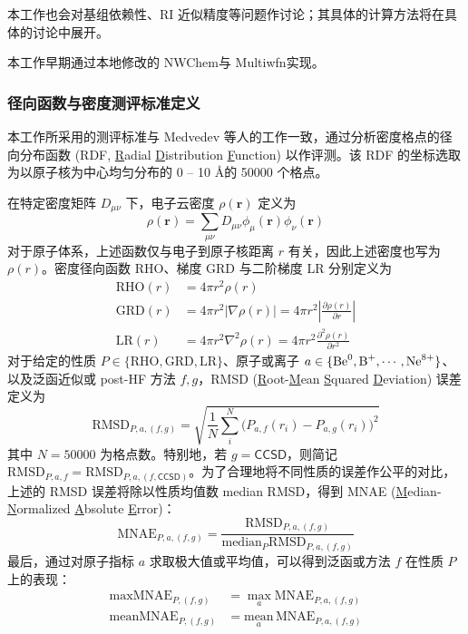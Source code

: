 本工作也会对基组依赖性、RI 近似精度等问题作讨论；其具体的计算方法将在具体的讨论中展开。

本工作早期通过本地修改的 NWChem\cite{Valiev-Jong.CPC.2010}与 Multiwfn\cite{Lu-Chen.JCC.2012}实现。

\subsubsection{径向函数与密度测评标准定义}

本工作所采用的测评标准与 Medvedev 等人的工作\cite{Medvedev-Lyssenko.S.2017}一致，通过分析密度格点的径向分布函数 (RDF, \underline{R}adial \underline{D}istribution \underline{F}unction) 以作评测。该 RDF 的坐标选取为以原子核为中心均匀分布的 0 -- 10 \AA 的 50000 个格点。

在特定密度矩阵 $D_{\mu \nu}$ 下，电子云密度 $\rho(\bm{r})$ 定义为
\begin{equation}
    \rho(\bm{r}) = \sum_{\mu \nu} D_{\mu \nu} \phi_{\mu} (\bm{r}) \phi_{\nu} (\bm{r})
\end{equation}
对于原子体系，上述函数仅与电子到原子核距离 $r$ 有关，因此上述密度也写为 $\rho(r)$。密度径向函数 RHO、梯度 GRD 与二阶梯度 LR 分别定义为
\begin{align}
    \text{RHO}(r) &= 4 \pi r^2 \rho(r) \\
    \text{GRD}(r) &= 4 \pi r^2 | \nabla \rho(r) | = 4 \pi r^2 \left| \frac{\partial \rho(r)}{\partial r} \right| \\
    \text{LR}(r) &= 4 \pi r^2 \nabla^2 \rho(r) = 4 \pi r^2 \frac{\partial^2 \rho(r)}{\partial r^2}
\end{align}
对于给定的性质 $P \in \{\text{RHO}, \text{GRD}, \text{LR}\}$、原子或离子 $a \in \{\ce{Be^0}, \ce{B^+}, \cdots, \ce{Ne^8+}\}$、以及泛函近似或 post-HF 方法 $f, g$，RMSD (\underline{R}oot-\underline{M}ean \underline{S}quared \underline{D}eviation) 误差定义为
\begin{equation}
    \text{RMSD}_{P, a, (f, g)} = \sqrt{\frac{1}{N} \sum_i^N \big(P_{a, f} (r_i) - P_{a, g} (r_i) \big)^2}
\end{equation}
其中 $N = 50000$ 为格点数。特别地，若 $g = \textsf{CCSD}$，则简记 $\text{RMSD}_{P, a, f} = \text{RMSD}_{P, a, (f, \textsf{CCSD})}$。为了合理地将不同性质的误差作公平的对比，上述的 RMSD 误差将除以性质均值数 median RMSD，得到 MNAE (\underline{M}edian-\underline{N}ormalized \underline{A}bsolute \underline{E}rror)：
\begin{equation}
    \text{MNAE}_{P, a, (f, g)} = \frac{\text{RMSD}_{P, a, (f, g)}}{\text{median}_{P} \text{RMSD}_{P, a, (f, g)}}
\end{equation}
最后，通过对原子指标 $a$ 求取极大值或平均值，可以得到泛函或方法 $f$ 在性质 $P$ 上的表现：
\begin{align}
    \text{maxMNAE}_{P, (f, g)} &= \max_a \text{MNAE}_{P, a, (f, g)} \\
    \text{meanMNAE}_{P, (f, g)} &= \underset{a}{\text{mean}} \, \text{MNAE}_{P, a, (f, g)}
\end{align}

